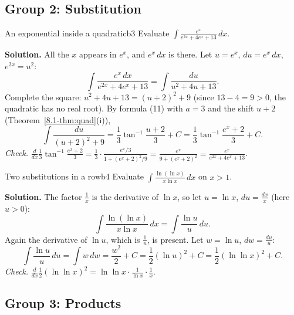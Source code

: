 \documentclass[11pt]{article}
\begin{document}
\subsection*{Group 2: Substitution}

\begin{exmp}{An exponential inside a quadratic}{b3}
Evaluate $\displaystyle\int\frac{e^x}{e^{2x}+4e^x+13}\,dx$.

\textbf{Solution.} All the $x$ appears in $e^x$, and $e^x\,dx$ is there. Let $u=e^x$, $du=e^x\,dx$, $e^{2x}=u^2$:
\[\int\frac{e^x\,dx}{e^{2x}+4e^x+13}=\int\frac{du}{u^2+4u+13} .\]
Complete the square: $u^2+4u+13=(u+2)^2+9$ (since $13-4=9>0$, the quadratic has no real root). By formula (11) with $a=3$ and the shift $u+2$ (Theorem~\ref{8.1-thm:quad}(i)),
\[\int\frac{du}{(u+2)^2+9}=\frac13\tan^{-1}\frac{u+2}3+C=\frac13\tan^{-1}\frac{e^x+2}3+C .\]
\emph{Check.} $\frac d{dx}\frac13\tan^{-1}\frac{e^x+2}3=\frac13\cdot\frac{e^x/3}{1+(e^x+2)^2/9}=\frac{e^x}{9+(e^x+2)^2}=\frac{e^x}{e^{2x}+4e^x+13}$.
\end{exmp}

\begin{exmp}{Two substitutions in a row}{b4}
Evaluate $\displaystyle\int\frac{\ln(\ln x)}{x\ln x}\,dx$ on $x>1$.

\textbf{Solution.} The factor $\frac1x$ is the derivative of $\ln x$, so let $u=\ln x$, $du=\frac{dx}x$ (here $u>0$):
\[\int\frac{\ln(\ln x)}{x\ln x}\,dx=\int\frac{\ln u}{u}\,du .\]
Again the derivative of $\ln u$, which is $\frac1u$, is present. Let $w=\ln u$, $dw=\frac{du}u$:
\[\int\frac{\ln u}u\,du=\int w\,dw=\frac{w^2}2+C=\frac12\left(\ln u\right)^2+C=\frac12\left(\ln\ln x\right)^2+C .\]
\emph{Check.} $\frac d{dx}\frac12(\ln\ln x)^2=\ln\ln x\cdot\frac1{\ln x}\cdot\frac1x$.
\end{exmp}

\subsection*{Group 3: Products}
\end{document}
